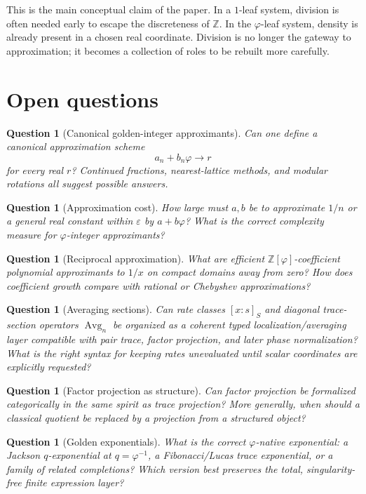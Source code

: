 \documentclass[11pt]{article}
\newtheorem{question}[definition]{Question}
\newcommand{\ph}{\varphi}
\newcommand{\Z}{\mathbb{Z}}
\begin{document}
This is the main conceptual claim of the paper.  In a $1$-leaf system, division is often needed early to escape the discreteness of $\Z$.  In the $\ph$-leaf system, density is already present in a chosen real coordinate.  Division is no longer the gateway to approximation; it becomes a collection of roles to be rebuilt more carefully.

\section{Open questions}

\begin{question}[Canonical golden-integer approximants]
Can one define a canonical approximation scheme
\[
    a_n+b_n\ph\to r
\]
for every real $r$?  Continued fractions, nearest-lattice methods, and modular rotations all suggest possible answers.
\end{question}

\begin{question}[Approximation cost]
How large must $a,b$ be to approximate $1/n$ or a general real constant within $\varepsilon$ by $a+b\ph$?  What is the correct complexity measure for $\ph$-integer approximants?
\end{question}

\begin{question}[Reciprocal approximation]
What are efficient $\Z[\ph]$-coefficient polynomial approximants to $1/x$ on compact domains away from zero?  How does coefficient growth compare with rational or Chebyshev approximations?
\end{question}

\begin{question}[Averaging sections]
Can rate classes $[x:s]_S$ and diagonal trace-section operators $\operatorname{Avg}_n$ be organized as a coherent typed localization/averaging layer compatible with pair trace, factor projection, and later phase normalization?  What is the right syntax for keeping rates unevaluated until scalar coordinates are explicitly requested?
\end{question}


\begin{question}[Factor projection as structure]
Can factor projection be formalized categorically in the same spirit as trace projection?  More generally, when should a classical quotient be replaced by a projection from a structured object?
\end{question}

\begin{question}[Golden exponentials]
What is the correct $\ph$-native exponential: a Jackson $q$-exponential at $q=\ph^{-1}$, a Fibonacci/Lucas trace exponential, or a family of related completions?  Which version best preserves the total, singularity-free finite expression layer?
\end{question}
\end{document}
